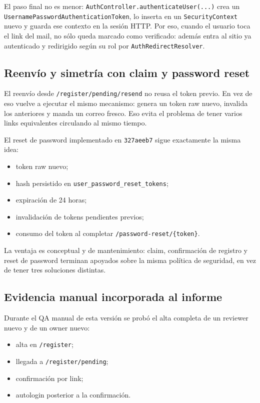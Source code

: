 \documentclass[11pt,a4paper]{report}
\newcommand{\commit}[1]{\texttt{#1}}
\newcommand{\code}[1]{\nolinkurl{#1}}
\begin{document}
El paso final no es menor: \code{AuthController.authenticateUser(...)} crea un \code{UsernamePasswordAuthenticationToken}, lo inserta en un \code{SecurityContext} nuevo y guarda ese contexto en la sesi\'on HTTP. Por eso, cuando el usuario toca el link del mail, no s\'olo queda marcado como verificado: adem\'as entra al sitio ya autenticado y redirigido seg\'un su rol por \code{AuthRedirectResolver}.

\subsection{Reenv\'io y simetr\'ia con claim y password reset}

El reenv\'io desde \code{/register/pending/resend} no reusa el token previo. En vez de eso vuelve a ejecutar el mismo mecanismo: genera un token raw nuevo, invalida los anteriores y manda un correo fresco. Eso evita el problema de tener varios links equivalentes circulando al mismo tiempo.

El reset de password implementado en \commit{327aeeb7} sigue exactamente la misma idea:

\begin{itemize}
  \item token raw nuevo;
  \item hash persistido en \code{user\_password\_reset\_tokens};
  \item expiraci\'on de 24 horas;
  \item invalidaci\'on de tokens pendientes previos;
  \item consumo del token al completar \code{/password-reset/\{token\}}.
\end{itemize}

La ventaja es conceptual y de mantenimiento: claim, confirmaci\'on de registro y reset de password terminan apoyados sobre la misma pol\'itica de seguridad, en vez de tener tres soluciones distintas.

\subsection{Evidencia manual incorporada al informe}

Durante el QA manual de esta versi\'on se prob\'o el alta completa de un reviewer nuevo y de un owner nuevo:

\begin{itemize}
  \item alta en \code{/register};
  \item llegada a \code{/register/pending};
  \item confirmaci\'on por link;
  \item autologin posterior a la confirmaci\'on.
\end{itemize}
\end{document}
